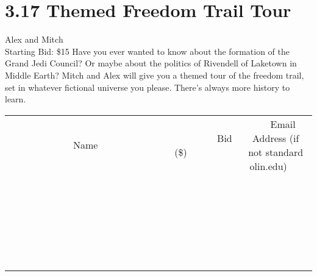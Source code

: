\documentclass[11pt]{article}
\begin{document}
\section*{3.17 Themed Freedom Trail Tour}
Alex and Mitch
\\
Starting Bid: \$15
\newline
Have you ever wanted to know about the formation of the Grand Jedi Council?
Or maybe about the politics of Rivendell of Laketown in Middle Earth?
Mitch and Alex will give you a themed tour of the freedom trail, set in whatever fictional universe you please. There's always more history to learn.
\\[6ex]
\begin{tabular}{c c c}
~~~~~~~~~~~~~Name~~~~~~~~~~~~~ & ~~~~~~~~~Bid (\$)~~~~~~~~~  & ~~~Email Address (if not standard olin.edu)~~~\\
 & & \\
\hline
 & & \\
\hline
 & & \\
\hline
 & & \\
\hline
 & & \\
\hline
 & & \\
\hline
 & & \\
\hline
 & & \\
\hline
 & & \\
\hline
 & & \\
\hline
 & & \\
\hline
 & & \\
\hline
 & & \\
\hline
 & & \\
\hline
 & & \\
\hline
 & & \\
\hline
 & & \\
\hline
 & & \\
\hline
 & & \\
\hline
 & & \\
\hline
 & & \\
\hline
 & & \\
\hline
 & & \\
\hline
 & & \\
\hline
 & & \\
\hline
 & & \\
\hline
\end{tabular}
\newpage
\end{document}
